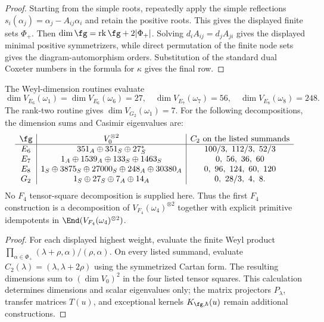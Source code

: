 \begin{proof}
Starting from the simple roots, repeatedly apply the simple reflections
$s_i(\alpha_j)=\alpha_j-A_{ij}\alpha_i$ and retain the positive roots.
This gives the displayed finite sets $\Phi_+$.  Then
$\dim\fg=\operatorname{rk}\fg+2|\Phi_+|$.  Solving
$d_iA_{ij}=d_jA_{ji}$ gives the displayed minimal positive
symmetrizers, while direct permutation of the finite node sets gives
the diagram-automorphism orders.  Substitution of the standard dual
Coxeter numbers in the formula for $\kappa$ gives the final row.
\end{proof}

\begin{proposition}
\label{prop:exceptional-fundamental-packet-scope}
The Weyl-dimension routines evaluate
\[
\dim V_{E_6}(\omega_1)=\dim V_{E_6}(\omega_6)=27,
\quad
\dim V_{E_7}(\omega_7)=56,
\quad
\dim V_{E_8}(\omega_8)=248.
\]
The rank-two routine gives $\dim V_{G_2}(\omega_1)=7$.
For the following decompositions, the dimension sums and Casimir
eigenvalues are:
\[
\begin{array}{c|c|c}
\fg&V_0^{\otimes2}&C_2\text{ on the listed summands}\\ \hline
E_6&351_A\oplus351_S\oplus27^*_S&100/3,\ 112/3,\ 52/3\\
E_7&1_A\oplus1539_A\oplus133_S\oplus1463_S&0,\ 56,\ 36,\ 60\\
E_8&1_S\oplus3875_S\oplus27000_S\oplus248_A\oplus30380_A
&0,\ 96,\ 124,\ 60,\ 120\\
G_2&1_S\oplus27_S\oplus7_A\oplus14_A&0,\ 28/3,\ 4,\ 8.
\end{array}
\]
No $F_4$ tensor-square decomposition is supplied here.  Thus the first
$F_4$ construction is a decomposition of
$V_{F_4}(\omega_4)^{\otimes2}$ together with explicit primitive
idempotents in $\End(V_{F_4}(\omega_4)^{\otimes2})$.
\end{proposition}

\begin{proof}
For each displayed highest weight, evaluate the finite Weyl product
$\prod_{\alpha\in\Phi_+}(\lambda+\rho,\alpha)/(\rho,\alpha)$.
On every listed summand, evaluate
$C_2(\lambda)=(\lambda,\lambda+2\rho)$ using the symmetrized Cartan
form.  The resulting dimensions sum to $(\dim V_0)^2$ in the four
listed tensor squares.  This calculation determines dimensions and
scalar eigenvalues only; the matrix projectors $P_\lambda$, transfer
matrices $T(u)$, and exceptional kernels $K_{\fg,\hbar}(u)$ remain
additional constructions.
\end{proof}

